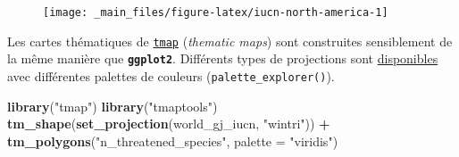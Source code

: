 \documentclass[]{book}
\newenvironment{Shaded}{\begin{snugshade}}{\end{snugshade}}
\newcommand{\CharTok}[1]{\textcolor[rgb]{0.31,0.60,0.02}{#1}}
\newcommand{\DataTypeTok}[1]{\textcolor[rgb]{0.13,0.29,0.53}{#1}}
\newcommand{\DecValTok}[1]{\textcolor[rgb]{0.00,0.00,0.81}{#1}}
\newcommand{\KeywordTok}[1]{\textcolor[rgb]{0.13,0.29,0.53}{\textbf{#1}}}
\newcommand{\NormalTok}[1]{#1}
\newcommand{\OperatorTok}[1]{\textcolor[rgb]{0.81,0.36,0.00}{\textbf{#1}}}
\newcommand{\StringTok}[1]{\textcolor[rgb]{0.31,0.60,0.02}{#1}}
\begin{document}
\begin{Shaded}
\end{Shaded}

\begin{figure}

{\centering \texttt{[image: \_main\_files/figure-latex/iucn-north-america-1]} 

}

\caption{ }\label{fig:iucn-north-america}
\end{figure}

Les cartes thématiques de
\href{https://www.jstatsoft.org/article/view/v084i06}{\texttt{tmap}}
(\emph{thematic maps}) sont construites sensiblement de la même manière
que \textbf{\texttt{ggplot2}}. Différents types de projections sont
\href{https://www.rdocumentation.org/packages/tmaptools/versions/2.0-1/topics/get_proj4}{disponibles}
avec différentes palettes de couleurs (\texttt{palette\_explorer()}).

\begin{Shaded}
\begin{Highlighting}[]
\KeywordTok{library}\NormalTok{(}\StringTok{"tmap"}\NormalTok{)}
\KeywordTok{library}\NormalTok{(}\StringTok{"tmaptools"}\NormalTok{)}
\KeywordTok{tm_shape}\NormalTok{(}\KeywordTok{set_projection}\NormalTok{(world_gj_iucn, }\StringTok{"wintri"}\NormalTok{)) }\OperatorTok{+}
\StringTok{  }\KeywordTok{tm_polygons}\NormalTok{(}\StringTok{"n_threatened_species"}\NormalTok{, }\DataTypeTok{palette =} \StringTok{"viridis"}\NormalTok{)}
\end{Highlighting}
\end{Shaded}
\end{document}
